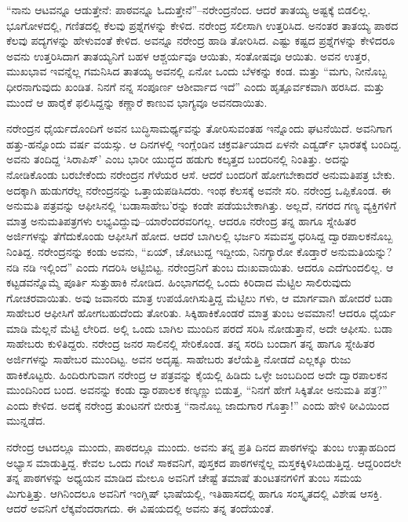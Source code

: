“ನಾನು ಆಟವನ್ನೂ ಆಡುತ್ತೇನೆ: ಪಾಠವನ್ನೂ ಓದುತ್ತೇನೆ”–ನರೇಂದ್ರನೆಂದ. ಆದರೆ ತಾತಯ್ಯ ಅಷ್ಟಕ್ಕೆ ಬಿಡಲಿಲ್ಲ. ಭೂಗೋಳದಲ್ಲಿ, ಗಣಿತದಲ್ಲಿ ಕೆಲವು ಪ್ರಶ್ನೆಗಳನ್ನು ಕೇಳಿದ. ನರೇಂದ್ರ ಸಲೀಸಾಗಿ ಉತ್ತರಿಸಿದ. ಅನಂತರ ತಾತಯ್ಯ ಪಾಠದ ಕೆಲವು ಪದ್ಯಗಳನ್ನು ಹೇಳುವಂತೆ ಕೇಳಿದ. ಅವನ್ನೂ ನರೇಂದ್ರ ಹಾಡಿ ತೋರಿಸಿದ. ಎಷ್ಟು ಕಷ್ಟದ ಪ್ರಶ್ನೆಗಳನ್ನು ಕೇಳಿದರೂ ಅವನು ಉತ್ತರಿಸಿದಾಗ ತಾತಯ್ಯನಿಗೆ ಬಹಳ ಆಶ್ಚರ್ಯವೂ ಆಯಿತು, ಸಂತೋಷವೂ ಆಯಿತು. ಅವನ ಉತ್ತರ, ಮುಖಭಾವ ಇವನ್ನೆಲ್ಲ ಗಮನಿಸಿದ ತಾತಯ್ಯ ಅವನಲ್ಲಿ ಏನೋ ಒಂದು ಬೆಳಕನ್ನು ಕಂಡ. ಮತ್ತು “ಮಗು, ನೀನೊಬ್ಬ ಧೀರನಾಗುವುದು ಖಂಡಿತ. ನಿನಗೆ ನನ್ನ ಸಂಪೂರ್ಣ ಆಶೀರ್ವಾದ ಇದೆ” ಎಂದು ಹೃತ್ಪೂರ್ವಕವಾಗಿ ಹರಸಿದ. ಮತ್ತು ಮುಂದೆ ಆ ಹಾರೈಕೆ ಫಲಿಸಿದ್ದನ್ನು ಕಣ್ಣಾರೆ ಕಾಣುವ ಭಾಗ್ಯವೂ ಅವನದಾಯಿತು.

ನರೇಂದ್ರನ ಧೈರ್ಯದೊಂದಿಗೆ ಅವನ ಬುದ್ಧಿಸಾಮರ್ಥ್ಯವನ್ನು ತೋರಿಸುವಂತಹ ಇನ್ನೊಂದು ಘಟನೆಯಿದೆ. ಅವನಿಗಾಗ ಹತ್ತು-ಹನ್ನೊಂದು ವರ್ಷ ವಯಸ್ಸು. ಆ ದಿನಗಳಲ್ಲಿ ಇಂಗ್ಲೆಂಡಿನ ಚಕ್ರವರ್ತಿಯಾದ ಏಳನೇ ಎಡ್ವರ್ಡ್ ಭಾರತಕ್ಕೆ ಬಂದಿದ್ದ. ಅವನು ತಂದಿದ್ದ ‘ಸಿರಾಪಿಸ್​’ ಎಂಬ ಭಾರೀ ಯುದ್ಧದ ಹಡುಗು ಕಲ್ಕತ್ತದ ಬಂದರಿನಲ್ಲಿ ನಿಂತಿತ್ತು. ಅದನ್ನು ನೋಡಿಕೊಂಡು ಬರಬೇಕೆಂದು ನರೇಂದ್ರನ ಗೆಳೆಯರ ಆಸೆ. ಆದರೆ ಬಂದರಿಗೆ ಹೋಗಬೇಕಾದರೆ ಅನುಮತಿಪತ್ರ ಬೇಕು. ಅದಕ್ಕಾಗಿ ಹುಡುಗರೆಲ್ಲ ನರೇಂದ್ರನನ್ನು ಒತ್ತಾಯಪಡಿಸಿದರು. ಇಂಥ ಕೆಲಸಕ್ಕೆ ಅವನೇ ಸರಿ. ನರೇಂದ್ರ ಒಪ್ಪಿಕೊಂಡ. ಈ ಅನುಮತಿ ಪತ್ರವನ್ನು ಆಫೀಸಿನಲ್ಲಿ ‘ಬಡಾಸಾಹೇಬ’ರನ್ನು ಕಂಡೇ ಪಡೆಯಬೇಕಾಗಿತ್ತು. ಅಲ್ಲದೆ, ನಗರದ ಗಣ್ಯ ವ್ಯಕ್ತಿಗಳಿಗೆ ಮಾತ್ರ ಅನುಮತಿಪತ್ರಗಳು ಲಭ್ಯವಿದ್ದುವು–ಯಾರೆಂದರವರಿಗಲ್ಲ. ಆದರೂ ನರೇಂದ್ರ ತನ್ನ ಹಾಗೂ ಸ್ನೇಹಿತರ ಅರ್ಜಿಗಳನ್ನು ತೆಗೆದುಕೊಂಡು ಆಫೀಸಿಗೆ ಹೋದ. ಆದರೆ ಬಾಗಿಲಲ್ಲಿ ಭರ್ಜರಿ ಸಮವಸ್ತ್ರ ಧರಿಸಿದ್ದ ದ್ವಾರಪಾಲಕನೊಬ್ಬ ನಿಂತಿದ್ದ. ನರೇಂದ್ರನನ್ನು ಕಂಡು ಅವನು, “ಏಯ್, ಚೋಟುದ್ದ ಇದ್ದೀಯ, ನಿನಗ್ಯಾರೋ ಕೊಡ್ತಾರೆ ಅನುಮತಿಯನ್ನು? ನಡಿ ನಡಿ ಇಲ್ಲಿಂದ” ಎಂದು ಗದರಿಸಿ ಅಟ್ಟಿಬಿಟ್ಟ. ನರೇಂದ್ರನಿಗೆ ತುಂಬ ದುಃಖವಾಯಿತು. ಆದರೂ ಎದೆಗುಂದಲಿಲ್ಲ. ಆ ಕಟ್ಟಡವನ್ನೊಮ್ಮೆ ಪೂರ್ತಿ ಸುತ್ತುಹಾಕಿ ನೋಡಿದ. ಹಿಂಭಾಗದಲ್ಲಿ ಒಂದು ಕಿರಿದಾದ ಮೆಟ್ಟಿಲ ಸಾಲಿರುವುದು ಗೋಚರವಾಯಿತು. ಅವು ಜವಾನರು ಮಾತ್ರ ಉಪಯೋಗಿಸುತ್ತಿದ್ದ ಮೆಟ್ಟಿಲು ಗಳು, ಆ ಮಾರ್ಗವಾಗಿ ಹೋದರೆ ಬಡಾ ಸಾಹೇಬರ ಆಫೀಸಿಗೆ ಹೋಗಬಹುದೆಂದು ತೋರಿತು. ಸಿಕ್ಕಿಹಾಕಿಕೊಂಡರೆ ಮಾತ್ರ ತುಂಬ ಅವಮಾನ! ಆದರೂ ಧೈರ್ಯ ಮಾಡಿ ಮೆಲ್ಲನೆ ಮೆಟ್ಟಿ ಲೇರಿದ. ಅಲ್ಲಿ ಒಂದು ಬಾಗಿಲ ಮುಂದಿನ ಪರದೆ ಸರಿಸಿ ನೋಡುತ್ತಾನೆ, ಅದೇ ಆಫೀಸು. ಬಡಾ ಸಾಹೇಬರು ಕುಳಿತಿದ್ದರು. ನರೇಂದ್ರ ಜನರ ಸಾಲಿನಲ್ಲಿ ಸೇರಿಕೊಂಡ. ತನ್ನ ಸರದಿ ಬಂದಾಗ ತನ್ನ ಹಾಗೂ ಸ್ನೇಹಿತರ ಅರ್ಜಿಗಳನ್ನು ಸಾಹೇಬರ ಮುಂದಿಟ್ಟ. ಅವನ ಅದೃಷ್ಟ. ಸಾಹೇಬರು ತಲೆಯೆತ್ತಿ ನೋಡದೆ ಎಲ್ಲಕ್ಕೂ ರುಜು ಹಾಕಿಕೊಟ್ಟರು. ಹಿಂದಿರುಗುವಾಗ ನರೇಂದ್ರ ಆ ಪತ್ರವನ್ನು ಕೈಯಲ್ಲಿ ಹಿಡಿದು ಒಳ್ಳೇ ಜಂಬದಿಂದ ಅದೇ ದ್ವಾರಪಾಲಕನ ಮುಂದಿನಿಂದ ಬಂದ. ಅವನನ್ನು ಕಂಡು ದ್ವಾರಪಾಲಕ ಕಣ್ಕಣ್ಣು ಬಿಡುತ್ತ, “ನಿನಗೆ ಹೇಗೆ ಸಿಕ್ಕಿತೋ ಅನುಮತಿ ಪತ್ರ?” ಎಂದು ಕೇಳಿದ. ಅದಕ್ಕೆ ನರೇಂದ್ರ ತುಂಟನಗೆ ಬೀರುತ್ತ “ನಾನೊಬ್ಬ ಜಾದುಗಾರ ಗೊತ್ತಾ!” ಎಂದು ಹೇಳಿ ಠೀವಿಯಿಂದ ಮುನ್ನಡೆದ.

ನರೇಂದ್ರ ಆಟದಲ್ಲೂ ಮುಂದು, ಪಾಠದಲ್ಲೂ ಮುಂದು. ಅವನು ತನ್ನ ಪ್ರತಿ ದಿನದ ಪಾಠಗಳನ್ನು ತುಂಬ ಉತ್ಸಾಹದಿಂದ ಅಭ್ಯಾಸ ಮಾಡುತ್ತಿದ್ದ. ಕೇವಲ ಒಂದು ಗಂಟೆ ಸಾಕವನಿಗೆ, ಪುಸ್ತಕದ ಪಾಠಗಳನ್ನೆಲ್ಲ ಮಸ್ತಕಕ್ಕಿಳಿಸಿಬಿಡುತ್ತಿದ್ದ. ಆದ್ದರಿಂದಲೇ ತನ್ನ ಪಾಠಗಳನ್ನು ಅಧ್ಯಯನ ಮಾಡಿದ ಮೇಲೂ ಅವನಿಗೆ ಚೇಷ್ಟೆ ತಮಾಷೆ ತುಂಟತನಗಳಿಗೆ ತುಂಬ ಸಮಯ ಮಿಗುತ್ತಿತ್ತು. ಆಗಿನಿಂದಲೂ ಅವನಿಗೆ ಇಂಗ್ಲಿಷ್ ಭಾಷೆಯಲ್ಲಿ, ಇತಿಹಾಸದಲ್ಲಿ ಹಾಗೂ ಸಂಸ್ಕೃತದಲ್ಲಿ ವಿಶೇಷ ಆಸಕ್ತಿ. ಆದರೆ ಅವನಿಗೆ ಲೆಕ್ಕವೆಂದರಾಗದು. ಈ ವಿಷಯದಲ್ಲಿ ಅವನು ತನ್ನ ತಂದೆಯಂತೆ.

